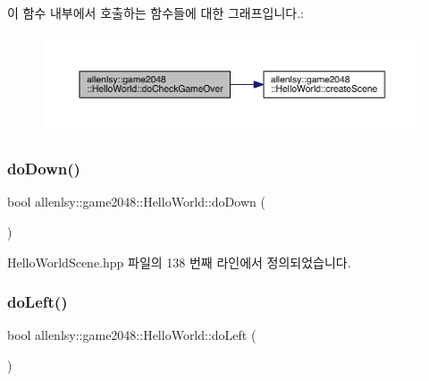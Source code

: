 이 함수 내부에서 호출하는 함수들에 대한 그래프입니다.\+:
\nopagebreak
\begin{figure}[H]
\begin{center}
\leavevmode
\includegraphics[width=350pt]{classallenlsy_1_1game2048_1_1_hello_world_a4f9c99959e2c14cd349470d305909fca_cgraph}
\end{center}
\end{figure}
\mbox{\label{classallenlsy_1_1game2048_1_1_hello_world_ad16dcf9910ecb3abdb12d87765032106}} 
\subsubsection{\texorpdfstring{do\+Down()}{doDown()}}
{\footnotesize\ttfamily bool allenlsy\+::game2048\+::\+Hello\+World\+::do\+Down (\begin{DoxyParamCaption}{ }\end{DoxyParamCaption})\hspace{0.3cm}{\ttfamily [inline]}}



Hello\+World\+Scene.\+hpp 파일의 138 번째 라인에서 정의되었습니다.

\mbox{\label{classallenlsy_1_1game2048_1_1_hello_world_a1c43b15b314d8d7efaae6f51bef14c56}} 
\subsubsection{\texorpdfstring{do\+Left()}{doLeft()}}
{\footnotesize\ttfamily bool allenlsy\+::game2048\+::\+Hello\+World\+::do\+Left (\begin{DoxyParamCaption}{ }\end{DoxyParamCaption})\hspace{0.3cm}{\ttfamily [inline]}}



